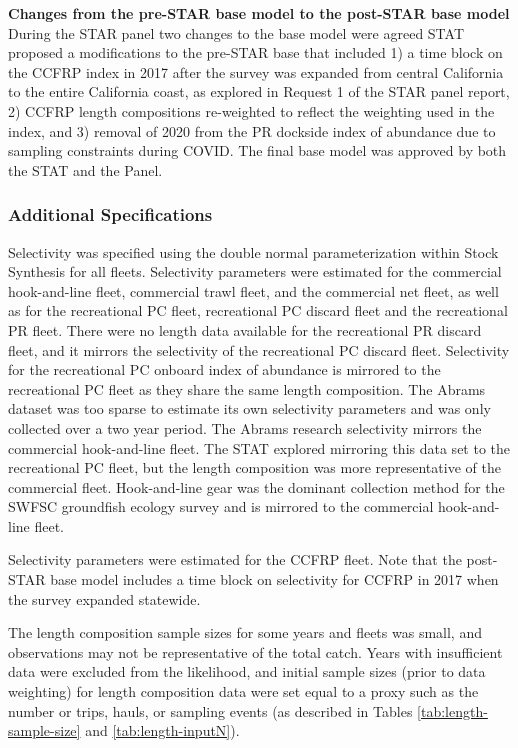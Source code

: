 \documentclass[11pt,
  english,
]{article}
\begin{document}
\textbf{Changes from the pre-STAR base model to the post-STAR base model}\\
During the STAR panel two changes to the base model were agreed STAT proposed a modifications to the pre-STAR base that included 1) a time block on the CCFRP index in 2017 after the survey was expanded from central California to the entire California coast, as explored in Request 1 of the STAR panel report, 2) CCFRP length compositions re-weighted to reflect the weighting used in the index, and 3) removal of 2020 from the PR dockside index of abundance due to sampling constraints during COVID. The final base model was approved by both the STAT and the Panel.


\hypertarget{additional-specifications}{%
\subsubsection{Additional Specifications}\label{additional-specifications}}

\leavevmode\tagmcend\tagstructend

Selectivity was specified using the double normal parameterization within Stock Synthesis for all fleets. Selectivity parameters were estimated for the commercial hook-and-line fleet, commercial trawl fleet, and the commercial net fleet, as well as for the recreational PC fleet, recreational PC discard fleet and the recreational PR fleet. There were no length data available for the recreational PR discard fleet, and it mirrors the selectivity of the recreational PC discard fleet. Selectivity for the recreational PC onboard index of abundance is mirrored to the recreational PC fleet as they share the same length composition. The Abrams dataset was too sparse to estimate its own selectivity parameters and was only collected over a two year period. The Abrams research selectivity mirrors the commercial hook-and-line fleet. The STAT explored mirroring this data set to the recreational PC fleet, but the length composition was more representative of the commercial fleet. Hook-and-line gear was the dominant collection method for the SWFSC groundfish ecology survey and is mirrored to the commercial hook-and-line fleet.

Selectivity parameters were estimated for the CCFRP fleet. Note that the post-STAR base model includes a time block on selectivity for CCFRP in 2017 when the survey expanded statewide.

The length composition sample sizes for some years and fleets was small, and observations may not be representative of the total catch. Years with insufficient data were excluded from the likelihood, and initial sample sizes (prior to data weighting) for length composition data were set equal to a proxy such as the number or trips, hauls, or sampling events (as described in Tables \ref{tab:length-sample-size} and \ref{tab:length-inputN}).
\end{document}
